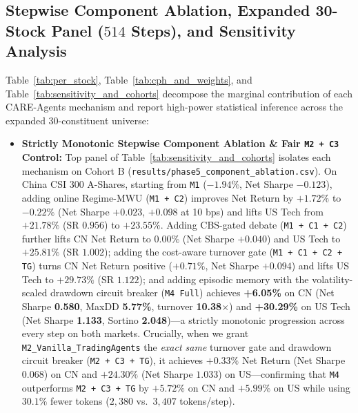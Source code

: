 \documentclass[10pt,a4paper,twocolumn]{article}
\begin{document}
\subsection{Stepwise Component Ablation, Expanded 30-Stock Panel ($514$ Steps), and Sensitivity Analysis}

Table~\ref{tab:per_stock}, Table~\ref{tab:cph_and_weights}, and Table~\ref{tab:sensitivity_and_cohorts} decompose the marginal contribution of each CARE-Agents mechanism and report high-power statistical inference across the expanded 30-constituent universe:
\begin{itemize}\sloppy
  \setlength{\itemsep}{1pt}\setlength{\parskip}{0pt}
  \item \textbf{Strictly Monotonic Stepwise Component Ablation \& Fair \texttt{M2 + C3} Control:} Top panel of Table~\ref{tab:sensitivity_and_cohorts} isolates each mechanism on Cohort B (\texttt{results/phase5\_component\_ablation.csv}). On China CSI 300 A-Shares, starting from \texttt{M1} ($-1.94\%$, Net Sharpe $-0.123$), adding online Regime-MWU (\texttt{M1 + C2}) improves Net Return by $+1.72\%$ to $-0.22\%$ (Net Sharpe $+0.023$, $+0.098$ at 10 bps) and lifts US Tech from $+21.78\%$ (SR $0.956$) to $+23.55\%$. Adding CBS-gated debate (\texttt{M1 + C1 + C2}) further lifts CN Net Return to $0.00\%$ (Net Sharpe $+0.040$) and US Tech to $+25.81\%$ (SR $1.002$); adding the cost-aware turnover gate (\texttt{M1 + C1 + C2 + TG}) turns CN Net Return positive ($+0.71\%$, Net Sharpe $+0.094$) and lifts US Tech to $+29.73\%$ (SR $1.122$); and adding episodic memory with the volatility-scaled drawdown circuit breaker (\texttt{M4 Full}) achieves \textbf{+6.05\%} on CN (Net Sharpe \textbf{0.580}, MaxDD \textbf{5.77\%}, turnover \textbf{10.38$\times$}) and \textbf{+30.29\%} on US Tech (Net Sharpe \textbf{1.133}, Sortino \textbf{2.048})---a strictly monotonic progression across every step on both markets. Crucially, when we grant \texttt{M2\_Vanilla\_TradingAgents} the \emph{exact same} turnover gate and drawdown circuit breaker (\texttt{M2 + C3 + TG}), it achieves $+0.33\%$ Net Return (Net Sharpe $0.068$) on CN and $+24.30\%$ (Net Sharpe $1.033$) on US---confirming that \texttt{M4} outperforms \texttt{M2 + C3 + TG} by $+5.72\%$ on CN and $+5.99\%$ on US while using $30.1\%$ fewer tokens ($2,380$ vs.\ $3,407$ tokens/step).

\end{itemize}
\end{document}
